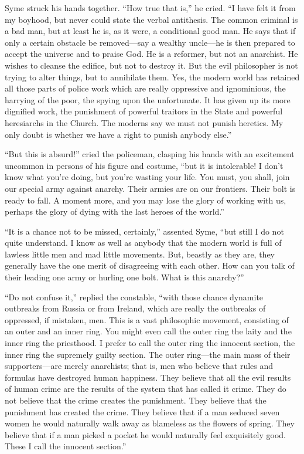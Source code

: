 \documentclass{book}
\begin{document}
Syme struck his hands together. “How true that is,” he cried. “I have felt it from my boyhood, but never could state the verbal antithesis. The common criminal is a bad man, but at least he is, as it were, a conditional good man. He says that if only a certain obstacle be removed—say a wealthy uncle—he is then prepared to accept the universe and to praise God. He is a reformer, but not an anarchist. He wishes to cleanse the edifice, but not to destroy it. But the evil philosopher is not trying to alter things, but to annihilate them. Yes, the modern world has retained all those parts of police work which are really oppressive and ignominious, the harrying of the poor, the spying upon the unfortunate. It has given up its more dignified work, the punishment of powerful traitors in the State and powerful heresiarchs in the Church. The moderns say we must not punish heretics. My only doubt is whether we have a right to punish anybody else.”

“But this is absurd!” cried the policeman, clasping his hands with an excitement uncommon in persons of his figure and costume, “but it is intolerable! I don’t know what you’re doing, but you’re wasting your life. You must, you shall, join our special army against anarchy. Their armies are on our frontiers. Their bolt is ready to fall. A moment more, and you may lose the glory of working with us, perhaps the glory of dying with the last heroes of the world.”

“It is a chance not to be missed, certainly,” assented Syme, “but still I do not quite understand. I know as well as anybody that the modern world is full of lawless little men and mad little movements. But, beastly as they are, they generally have the one merit of disagreeing with each other. How can you talk of their leading one army or hurling one bolt. What is this anarchy?”

“Do not confuse it,” replied the constable, “with those chance dynamite outbreaks from Russia or from Ireland, which are really the outbreaks of oppressed, if mistaken, men. This is a vast philosophic movement, consisting of an outer and an inner ring. You might even call the outer ring the laity and the inner ring the priesthood. I prefer to call the outer ring the innocent section, the inner ring the supremely guilty section. The outer ring—the main mass of their supporters—are merely anarchists; that is, men who believe that rules and formulas have destroyed human happiness. They believe that all the evil results of human crime are the results of the system that has called it crime. They do not believe that the crime creates the punishment. They believe that the punishment has created the crime. They believe that if a man seduced seven women he would naturally walk away as blameless as the flowers of spring. They believe that if a man picked a pocket he would naturally feel exquisitely good. These I call the innocent section.”
\end{document}

